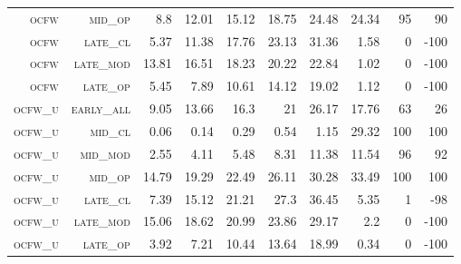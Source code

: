 \begin{landscape}
\begin{table}[!htbp]
\begin{tabular}{@{}rrrrrrr|rrr@{}}
 \textsc{ocfw}        &  \textsc{mid\_op   }      &  8.8            &  12.01            &  15.12     &  18.75           &  24.48      &  24.34    &  95    &  90       \\
 \textsc{ocfw}        &  \textsc{late\_cl  }      &  5.37           &  11.38            &  17.76     &  23.13           &  31.36      &  1.58     &  0     &  -100      \\
 \textsc{ocfw}        &  \textsc{late\_mod }      &  13.81          &  16.51            &  18.23     &  20.22           &  22.84      &  1.02     &  0     &  -100      \\
 \textsc{ocfw}        &  \textsc{late\_op  }      &  5.45           &  7.89             &  10.61     &  14.12           &  19.02      &  1.12     &  0     &  -100      \\
 \textsc{ocfw\_u}     &  \textsc{early\_all}      &  9.05           &  13.66            &  16.3      &  21              &  26.17      &  17.76    &  63    &  26       \\
 \textsc{ocfw\_u}     &  \textsc{mid\_cl   }      &  0.06           &  0.14             &  0.29      &  0.54            &  1.15       &  29.32    &  100   &  100      \\
 \textsc{ocfw\_u}     &  \textsc{mid\_mod  }      &  2.55           &  4.11             &  5.48      &  8.31            &  11.38      &  11.54    &  96    &  92       \\
 \textsc{ocfw\_u}     &  \textsc{mid\_op   }      &  14.79          &  19.29            &  22.49     &  26.11           &  30.28      &  33.49    &  100   &  100      \\
 \textsc{ocfw\_u}     &  \textsc{late\_cl  }      &  7.39           &  15.12            &  21.21     &  27.3            &  36.45      &  5.35     &  1     &  -98      \\
 \textsc{ocfw\_u}     &  \textsc{late\_mod }      &  15.06          &  18.62            &  20.99     &  23.86           &  29.17      &  2.2      &  0     &  -100    \\
 \textsc{ocfw\_u}     &  \textsc{late\_op  }      &  3.92           &  7.21             &  10.44     &  13.64           &  18.99      &  0.34     &  0     &  -100      \\
\end{tabular}
\end{table}
\end{landscape}

